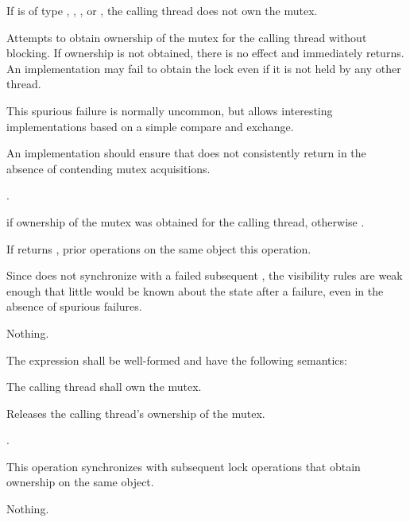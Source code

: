 \begin{itemdescr}
\pnum
\requires If  is of type , ,
, or , the calling
thread does not own the mutex.

\pnum
\effects Attempts to obtain ownership of the mutex for the calling thread without
blocking. If ownership is not obtained, there is no effect and 
immediately returns. An implementation may fail to obtain the lock even if it is not
held by any other thread. \begin{note} This spurious failure is normally uncommon, but
allows interesting implementations based on a simple
compare and exchange.
\end{note}
An implementation should ensure that  does not consistently return 
in the absence of contending mutex acquisitions.

\pnum
\returntype {}.

\pnum
\returns {} if ownership of the mutex was obtained for the calling
thread, otherwise .

\pnum
\sync If  returns , prior  operations
on the same object  this operation.
\begin{note} Since  does not synchronize with a failed subsequent
, the visibility rules are weak enough that little would be
known about the state after a failure, even in the absence of spurious failures. \end{note}

\pnum
\throws Nothing.
\end{itemdescr}

\pnum
The expression  shall be well-formed and have the following semantics:

\begin{itemdescr}
\pnum
\requires The calling thread shall own the mutex.

\pnum
\effects Releases the calling thread's ownership of the mutex.

\pnum
\returntype {}.

\pnum
\sync This operation synchronizes with subsequent
lock operations that obtain ownership on the same object.

\pnum
\throws Nothing.
\end{itemdescr}

